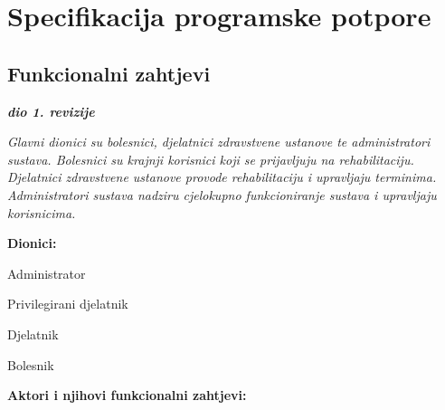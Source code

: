 \chapter{Specifikacija programske potpore}

\section{Funkcionalni zahtjevi}


\newcommand{\usecase}[1]{
  \refstepcounter{UCCounter} %
  \noindent\underbar{\textbf{UC\theUCCounter{} - #1}} %
  \begin{packed_item}
}

\newcommand{\closeusecase}{
  \end{packed_item}
  \vspace{1em}
}

\textbf{\textit{dio 1. revizije}}

\textit{ Glavni dionici su bolesnici, djelatnici zdravstvene ustanove te administratori sustava. Bolesnici su krajnji korisnici koji se prijavljuju na rehabilitaciju. Djelatnici zdravstvene ustanove provode rehabilitaciju i upravljaju terminima. Administratori sustava nadziru cjelokupno funkcioniranje sustava i upravljaju korisnicima.}


\noindent \textbf{Dionici:}

\begin{packed_enum}

	\item Administrator
	\item Privilegirani djelatnik
	\item Djelatnik
	\item Bolesnik

\end{packed_enum}

\noindent \textbf{Aktori i njihovi funkcionalni zahtjevi:}


